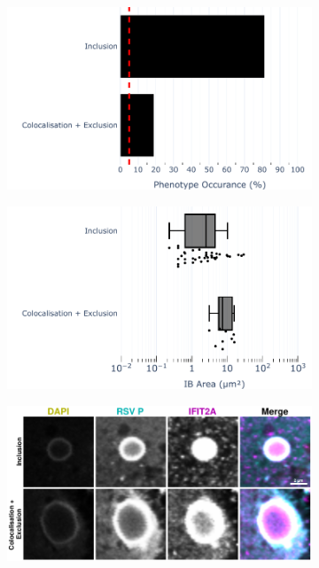 \begin{figure}
    \begin{subfigure}{0.5\textwidth}
        \caption{}
        \includegraphics[width=1\linewidth]{10. Chapter 5/Figs/01. Infection/01. IFIT2A/04. bar_i2a_a549-p.pdf} 
    \end{subfigure}
    \begin{subfigure}{0.5\textwidth}
        \caption{}
        \includegraphics[width=1\linewidth]{10. Chapter 5/Figs/01. Infection/01. IFIT2A/05. box_i2a_a549-p.pdf}
    \end{subfigure}
    \begin{subfigure}{1\textwidth}
        \caption{}
        \includegraphics[width=1\linewidth]{10. Chapter 5/Figs/01. Infection/01. IFIT2A/06. i2a a549 hrsv p.pdf} 

\end{subfigure}
\end{figure}
